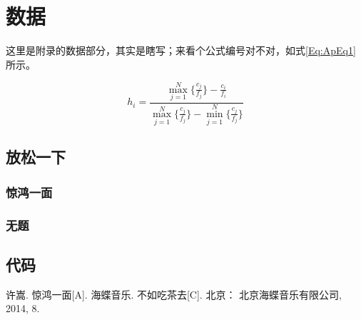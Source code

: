 \chapter{数据}
这里是附录的数据部分，其实是瞎写；来看个公式编号对不对，如式\eqref{Eq:ApEq1}所示。

\begin{equation}\label{Eq:ApEq1}
h_i = \frac{\max_{j=1}^{N}\{\frac{c_j}{f_j}\}-\frac{c_i}{f_i}}{\max_{j=1}^{N}\{\frac{c_j}{f_j}\}-\min_{j=1}^{N}\{\frac{c_j}{f_j}\}}
\end{equation}

\section{放松一下}
\subsection{惊鸿一面}


\subsection{无题}

\section{代码}





\begin{thebibliography}{A1}
许嵩. 惊鸿一面[A]. 海蝶音乐. 不如吃茶去[C]. 北京： 北京海蝶音乐有限公司, 2014, 8.

\end{thebibliography}
